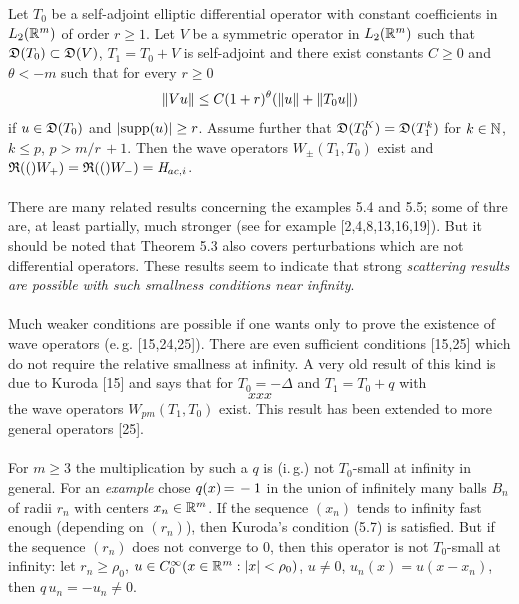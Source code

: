 \documentclass[11pt,twoside]{article}
\begin{document}
\begin{theorem}
Let $T_0$ be a self-adjoint elliptic differential operator
with constant coefficients in $L_2({\mathbb{R}}^m)$ of order $r \geq 1$.
Let $V$ be a symmetric operator in $L_2({\mathbb{R}}^m)$ such that
$\mathfrak{D}(T_0) \subset \mathfrak{D}(V)$, $T_1 = T_0+V$ is self-adjoint and there
exist constants $C \geq 0$ and $\theta < -m$ such that for every $r \geq 0$
\[
\left\lVert Vu \right\rVert \leq C (1+r)^{\theta} (\left\lVert u \right\rVert+\left\lVert T_0 u \right\rVert)
\]
if $u \in \mathfrak{D}(T_0)$ and $\abs{ \supp u} \geq r$.
Assume further that $\mathfrak{D}(T_0^K) = \mathfrak{D}(T_1^k)$
for $k \in {\mathbb{N}}$, $k \leq p$, $p > m/r\,+1$.
Then the wave operators $W_{\pm}(T_1,T_0)$ exist and
$\mathfrak{R}(()W_+) = \mathfrak{R}(()W_-) = \mathit{H}_{ac,i}$.
\end{theorem}



\paragraph*{}
There are many related results concerning the examples 5.4 and 5.5;
some of thre are, at least partially, much stronger
(see for example [2,4,8,13,16,19]).
But it should be noted that Theorem 5.3 also covers perturbations which are
not differential operators. These results seem to indicate that strong
\textit{scattering results are possible with such smallness conditions near infinity}.

\paragraph*{}
Much weaker conditions are possible if one wants only to prove the existence
of wave operators (e.\,g. [15,24,25]).
There are even sufficient conditions [15,25] which do not require the relative
smallness at infinity. A very old result of this kind is due to Kuroda [15]
and says that for $T_0 = -\Delta$ and $T_1 = T_0 +q$ with
\begin{equation}\tag{5.7}
xxx
\end{equation}
the wave operators $W_{pm}(T_1,T_0)$ exist.
This result has been extended to more general operators [25].

\paragraph*{}
For $m \geq 3$ the multiplication by such a $q$ is (i.\,g.) not $T_0$-small
at infinity in general.
For an \textit{example} chose $q(x) {\,=\,} -1$ in the union of infinitely many
balls $B_n$ of radii $r_n$ with centers $x_n \in {\mathbb{R}}^m$.
If the sequence $(x_n)$ tends to infinity fast enough (depending on $(r_n)$),
then Kuroda's condition (5.7) is satisfied.
But if the sequence $(r_n)$ does not converge to $0$, then this operator
is not $T_0$-small at infinity: let $r_n \geq \rho_0$,
$u \in C_0^{\infty}(x \in \R^m: \abs{x} < \rho_0)$, $u \neq 0$,
$u_n(x) = u(x-x_n)$, then $q\,u_n = -u_n \neq 0$.
\end{document}
